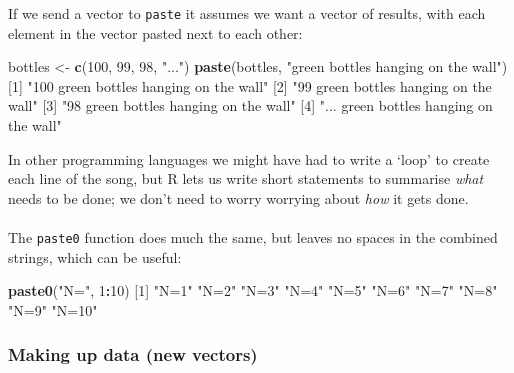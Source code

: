 \documentclass[]{article}
\newenvironment{Shaded}{\begin{snugshade}}{\end{snugshade}}
\newcommand{\DecValTok}[1]{\textcolor[rgb]{0.00,0.00,0.81}{#1}}
\newcommand{\KeywordTok}[1]{\textcolor[rgb]{0.13,0.29,0.53}{\textbf{#1}}}
\newcommand{\NormalTok}[1]{#1}
\newcommand{\OperatorTok}[1]{\textcolor[rgb]{0.81,0.36,0.00}{\textbf{#1}}}
\newcommand{\StringTok}[1]{\textcolor[rgb]{0.31,0.60,0.02}{#1}}
\let\oldparagraph\paragraph
\renewcommand{\paragraph}[1]{\oldparagraph{#1}\mbox{}}
\begin{document}
If we send a vector to \texttt{paste} it assumes we want a vector of results, with each
element in the vector pasted next to each other:

\begin{Shaded}
\begin{Highlighting}[]
\NormalTok{bottles <-}\StringTok{ }\KeywordTok{c}\NormalTok{(}\DecValTok{100}\NormalTok{, }\DecValTok{99}\NormalTok{, }\DecValTok{98}\NormalTok{, }\StringTok{"..."}\NormalTok{)}
\KeywordTok{paste}\NormalTok{(bottles, }\StringTok{"green bottles hanging on the wall"}\NormalTok{)}
\NormalTok{[}\DecValTok{1}\NormalTok{] }\StringTok{"100 green bottles hanging on the wall"}
\NormalTok{[}\DecValTok{2}\NormalTok{] }\StringTok{"99 green bottles hanging on the wall"} 
\NormalTok{[}\DecValTok{3}\NormalTok{] }\StringTok{"98 green bottles hanging on the wall"} 
\NormalTok{[}\DecValTok{4}\NormalTok{] }\StringTok{"... green bottles hanging on the wall"}
\end{Highlighting}
\end{Shaded}

In other programming languages we might have had to write a `loop' to create
each line of the song, but R lets us write short statements to summarise \emph{what}
needs to be done; we don't need to worry worrying about \emph{how} it gets done.

\hypertarget{paste0}{%
\paragraph{}\label{paste0}}

The \texttt{paste0} function does much the same, but leaves no spaces in the combined
strings, which can be useful:

\begin{Shaded}
\begin{Highlighting}[]
\KeywordTok{paste0}\NormalTok{(}\StringTok{"N="}\NormalTok{, }\DecValTok{1}\OperatorTok{:}\DecValTok{10}\NormalTok{)}
\NormalTok{ [}\DecValTok{1}\NormalTok{] }\StringTok{"N=1"}  \StringTok{"N=2"}  \StringTok{"N=3"}  \StringTok{"N=4"}  \StringTok{"N=5"}  \StringTok{"N=6"}  \StringTok{"N=7"}  \StringTok{"N=8"}  \StringTok{"N=9"}  \StringTok{"N=10"}
\end{Highlighting}
\end{Shaded}

\hypertarget{making-up-data-new-vectors}{%
\subsubsection*{Making up data (new vectors)}\label{making-up-data-new-vectors}}
\end{document}

